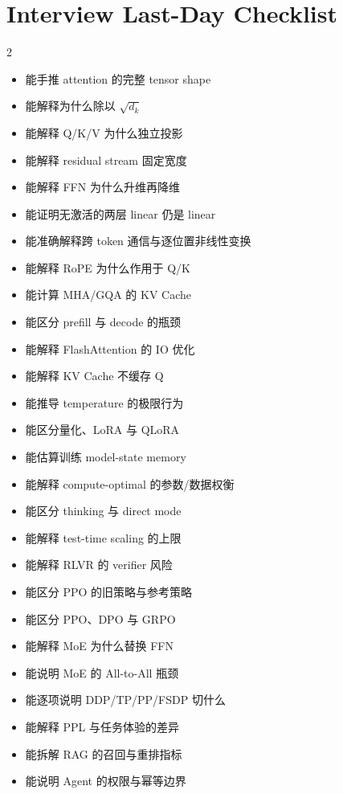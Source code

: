 \chapter{Interview Last-Day Checklist}

\begin{multicols}{2}
\begin{itemize}[label=$\square$]
  \item 能手推 attention 的完整 tensor shape
  \item 能解释为什么除以 $\sqrt{d_k}$
  \item 能解释 Q/K/V 为什么独立投影
  \item 能解释 residual stream 固定宽度
  \item 能解释 FFN 为什么升维再降维
  \item 能证明无激活的两层 linear 仍是 linear
  \item 能准确解释跨 token 通信与逐位置非线性变换
  \item 能解释 RoPE 为什么作用于 Q/K
  \item 能计算 MHA/GQA 的 KV Cache
  \item 能区分 prefill 与 decode 的瓶颈
  \item 能解释 FlashAttention 的 IO 优化
  \item 能解释 KV Cache 不缓存 Q
  \item 能推导 temperature 的极限行为
  \item 能区分量化、LoRA 与 QLoRA
  \item 能估算训练 model-state memory
  \item 能解释 compute-optimal 的参数/数据权衡
  \item 能区分 thinking 与 direct mode
  \item 能解释 test-time scaling 的上限
  \item 能解释 RLVR 的 verifier 风险
  \item 能区分 PPO 的旧策略与参考策略
  \item 能区分 PPO、DPO 与 GRPO
  \item 能解释 MoE 为什么替换 FFN
  \item 能说明 MoE 的 All-to-All 瓶颈
  \item 能逐项说明 DDP/TP/PP/FSDP 切什么
  \item 能解释 PPL 与任务体验的差异
  \item 能拆解 RAG 的召回与重排指标
  \item 能说明 Agent 的权限与幂等边界
\end{itemize}
\end{multicols}

